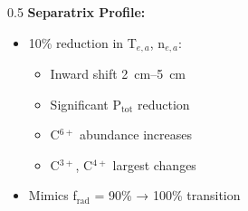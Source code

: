 \begin{frame}
{\begin{columns}
\begin{column}{0.5\textwidth}
            \textbf{Separatrix Profile:}
            \begin{itemize}
                \item 10\% reduction in T$_{e,a}$, n$_{e,a}$:
                    \begin{itemize}
                        \item Inward shift \SIrange{2}{5}{\centi\metre}
                        \item Significant P$_{\text{tot}}$ reduction
                        \item C$^{6+}$ abundance increases
                        \item C$^{3+}$, C$^{4+}$ largest changes
                    \end{itemize}
                \item Mimics f$_{\text{rad}}$ = 90\% → 100\% transition
            \end{itemize}
        \end{column}
    \end{columns}
    }

\end{frame}

